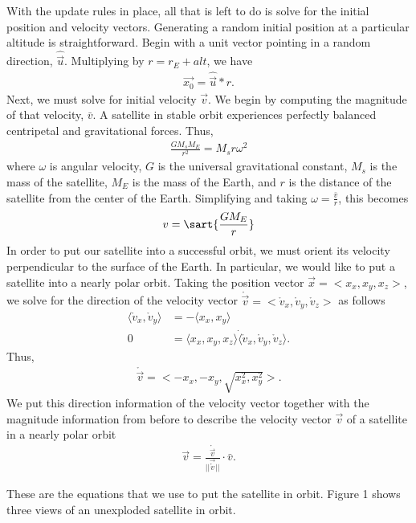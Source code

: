 \documentclass[12pt]{scrartcl}
\begin{document}
With the update rules in place, all that is left to do is solve for the initial position and velocity vectors. Generating a random initial position at a particular altitude is straightforward. Begin with a unit vector pointing in a random direction, $\hat{\vec{u}}$. Multiplying by $r = r_{E} + \mathit{alt}$, we have
\begin{align}
\vec{x_0} = \hat{\vec{u}} * r.
\end{align}
Next, we must solve for initial velocity $\vec{v}$. We begin by computing the magnitude of that velocity, $\bar{v}$. A satellite in stable orbit experiences perfectly balanced centripetal and gravitational forces. Thus,
\begin{align}
\frac{GM_{s}M_{E}}{r^2} = M_{s}r\omega^2 
\end{align}
where $\omega$ is angular velocity, $G$ is the universal gravitational constant, $M_{s}$ is the mass of the satellite, $M_{E}$ is the mass of the Earth, and $r$ is the distance of the satellite from the center of the Earth. Simplifying and taking $\omega = \frac{\bar{v}}{r}$, this becomes
\begin{align}
 v = \sart{\frac{G M_{E}}{r}}
\end{align}
In order to put our satellite into a successful orbit, we must orient its velocity perpendicular to the surface of the Earth. In particular, we would like to put a satellite into a nearly polar orbit. Taking the position vector $\vec{x} = <x_x, x_y, x_z>$, we solve for the direction of the velocity vector $\mathring{\vec{v}} = <\mathring{v}_x, \mathring{v}_y, \mathring{v}_z>$ as follows 
\begin{align}
\langle \mathring{v}_x, \mathring{v}_y \rangle &= - \langle x_x, x_y \rangle \\
0 &= \langle x_x, x_y, x_z \rangle \dot \langle \mathring{v}_x,\mathring{v}_y,\mathring{v}_z \rangle.
\end{align}
Thus,
\begin{align}
\mathring{\vec{v}} = <-x_x, -x_y, \sqrt{x_x^2, x_y^2}>.
\end{align}
We put this direction information of the velocity vector together with the magnitude information from before to describe the velocity vector $\vec{v}$ of a satellite in a nearly polar orbit
\begin{align}
\vec{v} = \frac{\mathring{\vec{v}}}{||\vec{\mathring{v}}||} \cdot \bar{v}.
\end{align}

These are the equations that we use to put the satellite in orbit. Figure 1 shows three views of an unexploded satellite in orbit.
\end{document}
